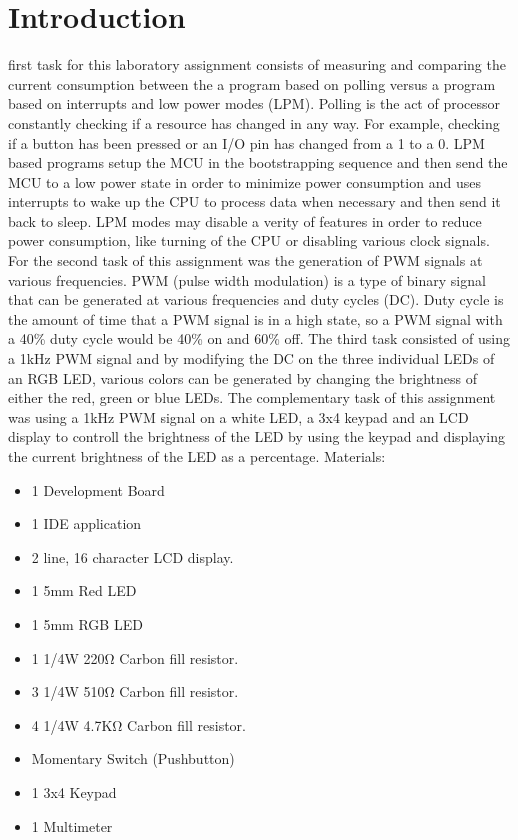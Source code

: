 \documentclass[journal]{IEEEtran}
\begin{document}
\section{Introduction}
 first task for this laboratory assignment consists of measuring and comparing the current consumption between the a program based on polling versus a program based on interrupts and low power modes (LPM). Polling is the act of processor constantly checking if a resource has changed in any way. For example, checking if a button has been pressed or an I/O pin has changed from a 1 to a 0. LPM based programs setup the MCU in the bootstrapping sequence and then send the MCU to a low power state in order to minimize power consumption and uses interrupts to wake up the CPU to process data when necessary and then send it back to sleep. LPM modes may disable a verity of features in order to reduce power consumption, like turning of the CPU or disabling various clock signals. For the second task of this assignment was the generation of PWM signals at various frequencies. PWM (pulse width modulation) is a type of binary signal that can be generated at various frequencies and duty cycles (DC). Duty cycle is the amount of time that a PWM signal is in a high state, so a PWM signal with a 40\% duty cycle would be 40\% on and 60\% off. The third task consisted of using a 1\si{kHz} PWM signal and by modifying the DC on the three individual LEDs of an RGB LED, various colors can be generated by changing the brightness of either the red, green or blue LEDs. The complementary task of this assignment was using a 1\si{kHz} PWM signal on a white LED, a 3x4 keypad and an LCD display to controll the brightness of the LED by using the keypad and displaying the current brightness of the LED as a percentage.
Materials:
\begin{itemize}
  \item 1 Development Board
  \item 1 IDE application
  \item 2 line, 16 character LCD display.
  \item 1 5mm Red LED
  \item 1 5mm RGB LED
  \item 1 1/4W 220\si{\ohm} Carbon fill resistor.
  \item 3 1/4W 510\si{\ohm} Carbon fill resistor.
  \item 4 1/4W 4.7K\si{\ohm} Carbon fill resistor.
  \item Momentary Switch (Pushbutton)
  \item 1 3x4 Keypad
  \item 1 Multimeter
\end{itemize}
\end{document}
